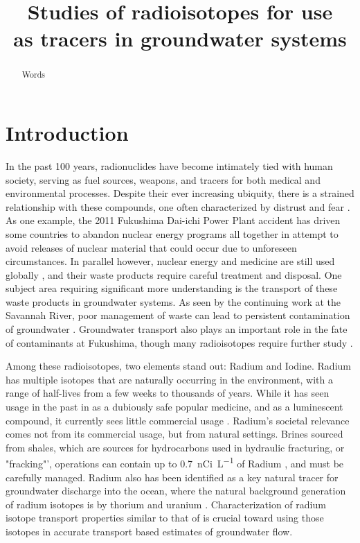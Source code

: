 \documentclass[twoside,12pt,titlepage]{article}
\title{Studies of radioisotopes for use \\as tracers in groundwater systems}
\author{\machen}
\newcommand{\isotope}[2]{\ch{^{#1}#2}}
\begin{document}
\maketitle
\thispagestyle{plain}

\begin{abstract}
Words
\end{abstract}

\section{Introduction}

In the past 100 years, radionuclides have become intimately tied with human society, serving as fuel sources, weapons, and tracers for both medical and environmental processes. Despite their ever increasing ubiquity, there is a strained relationship with these compounds, one often characterized by distrust and fear \cite{Hohenemser1977}. As one example, the 2011 Fukushima Dai-ichi Power Plant accident has driven some countries to abandon nuclear energy programs all together in attempt to avoid releases of nuclear material that could occur due to unforeseen circumstances. In parallel however, nuclear energy and medicine are still used globally \cite{Ramana2013}, and their waste products require careful treatment and disposal. One subject area requiring significant more understanding is the transport of these waste products in groundwater systems. As seen by the continuing work at the Savannah River, poor management of waste can lead to persistent contamination of groundwater \cite{Emerson2014}. Groundwater transport also plays an important role in the fate of contaminants at Fukushima, though many radioisotopes require further study \cite{Steinhauser2014}.
\par Among these radioisotopes, two elements stand out: Radium and Iodine. Radium has multiple isotopes that are naturally occurring in the environment, with a range of half-lives from a few weeks to thousands of years. While it has seen usage in the past in as a dubiously safe popular medicine, and as a luminescent compound, it currently sees little commercial usage \cite{WikiRadium}. Radium’s societal relevance comes not from its commercial usage, but from natural settings. Brines sourced from shales, which are sources for hydrocarbons used in hydraulic fracturing, or "fracking"', operations can contain up to \SI{0.7}{\nano Ci\per\liter} of Radium \cite{Barbot2013}, and must be carefully managed. Radium also has been identified as a key natural tracer for groundwater discharge into the ocean, where the natural background generation of radium isotopes is by thorium and uranium \cite{Moore2000}. Characterization of radium isotope transport properties similar to that of \isotope{137}{Cs} \cite{Steinhauser2014} is crucial toward using those isotopes in accurate transport based estimates of groundwater flow. 
\end{document}
